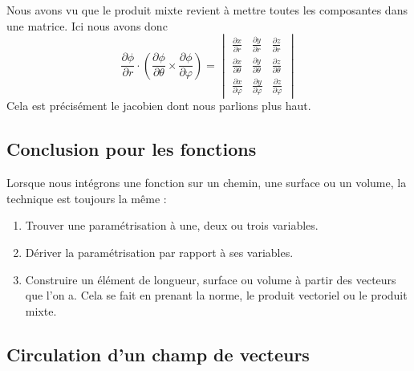 Nous avons vu que le produit mixte revient à mettre toutes les composantes dans une matrice. Ici nous avons donc
\begin{equation}
    \frac{ \partial \phi }{ \partial r }\cdot\left( \frac{ \partial \phi }{ \partial \theta }\times\frac{ \partial \phi }{ \partial \varphi } \right)=\begin{vmatrix}
        \frac{ \partial x }{ \partial r }    &   \frac{ \partial y }{ \partial r }    &   \frac{ \partial z }{ \partial r }    \\
        \frac{ \partial x }{ \partial \theta }    &   \frac{ \partial y }{ \partial \theta }    &   \frac{ \partial z }{ \partial \theta }    \\
        \frac{ \partial x }{ \partial \varphi }    &   \frac{ \partial y }{ \partial \varphi }    &   \frac{ \partial z }{ \partial \varphi }
    \end{vmatrix}
\end{equation}
Cela est précisément le jacobien dont nous parlions plus haut.

\subsection{Conclusion pour les fonctions}

Lorsque nous intégrons une fonction sur un chemin, une surface ou un volume, la technique est toujours la même :
\begin{enumerate}
    \item
        Trouver une paramétrisation à une, deux ou trois variables.
    \item
        Dériver la paramétrisation par rapport à ses variables.
    \item
        Construire un élément de longueur, surface ou volume à partir des vecteurs que l'on a. Cela se fait en prenant la norme, le produit vectoriel ou le produit mixte.
\end{enumerate}

\subsection{Circulation d'un champ de vecteurs}

